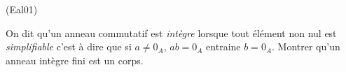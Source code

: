 \begin{tiny}(Eal01)\end{tiny} On dit qu'un anneau commutatif est \emph{intègre} lorsque tout élément non nul est \emph{simplifiable} c'est à dire que si $a\neq 0_A$, $ab=0_A$ entraine $b=0_A$. Montrer qu'un anneau intègre fini est un corps.